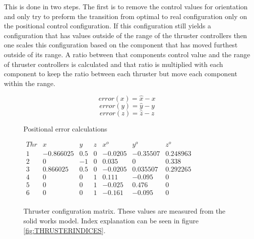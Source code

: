 This is done in two steps. The first is to remove the control values for orientation and only try to preform the transition from optimal to real configuration only on the positional control configuration. If this configuration still yields a configuration that has values outside of the range of the thruster controllers then one scales this configuration based on the component that has moved furthest outside of its range. A ratio between that components control value and the range of thruster controllers is calculated and that ratio is multiplied with each component to keep the ratio between each thruster but move each component within the range. 

\begin{center}
	\begin{figure}
	\begin{equation}
		\label{eq:POSITIONALERRORCALCX} 
		error(x) = \hat{x} - x
	\end{equation}
	\begin{equation}
		\label{eq:POSITIONALERRORCALCY}
		 error(y) = \hat{y} - y
	\end{equation}
	\begin{equation}
		\label{eq:POSITIONALERRORCALCZ} 
		error(z) = \hat{z} - z
	\end{equation}
	\caption{Positional error calculations}
	\end{figure}
\end{center}

\begin{figure}
	\begin{center}
		\begin{math}
			\begin{matrix}
				Thr & x & y & z & x^o & y^o & z^o\\
				1 & -0.866025 & 0.5 & 0 & -0.0205 & -0.35507 & 0.248963 \\
				2 & 0 & -1 & 0 & 0.035 & 0 & 0.338 \\
				3 & 0.866025 & 0.5 & 0 & -0.0205 & 0.035507 & 0.292265 \\
				4 & 0 & 0 & 1 & 0.111 & -0.095 & 0 \\
				5 & 0 & 0 & 1 & -0.025 & 0.476 & 0 \\
				6 & 0 & 0 & 1 & -0.161 & -0.095 & 0 \\
			\end{matrix}
		\end{math}
		\caption{Thruster configuration matrix. These values are measured from the solid works model. Index explanation can be seen  in figure \ref{fig:THRUSTERINDICES}.}
		\label{fig:THRUSTERCONFIGURATIONMATRIX}
	\end{center}
\end{figure}


